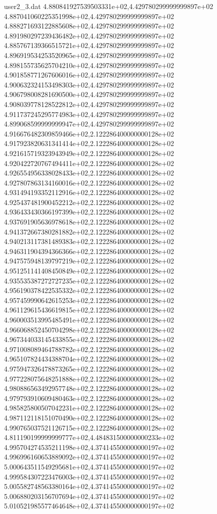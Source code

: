\begin{filecontents}{user2_3.dat}
4.880841927539503331e+02,4.429780299999999897e+02
4.887041060225351998e+02,4.429780299999999897e+02
4.888271693122885608e+02,4.429780299999999897e+02
4.891980297239436482e+02,4.429780299999999897e+02
4.885767139366515721e+02,4.429780299999999897e+02
4.896919534253520965e+02,4.429780299999999897e+02
4.898155735625704210e+02,4.429780299999999897e+02
4.901858771267606016e+02,4.429780299999999897e+02
4.900632324153498303e+02,4.429780299999999897e+02
4.906798008281690500e+02,4.429780299999999897e+02
4.908039778128522812e+02,4.429780299999999897e+02
4.911737245295774983e+02,4.429780299999999897e+02
4.899068599999999947e+02,4.429780299999999897e+02
4.916676482309859466e+02,2.122286400000000128e+02
4.917923820631341414e+02,2.122286400000000128e+02
4.921615719323943949e+02,2.122286400000000128e+02
4.920422720767494411e+02,2.122286400000000128e+02
4.926554956338028433e+02,2.122286400000000128e+02
4.927807863134160016e+02,2.122286400000000128e+02
4.931494193352112916e+02,2.122286400000000128e+02
4.925437481900452212e+02,2.122286400000000128e+02
4.936433430366197399e+02,2.122286400000000128e+02
4.937691905636978618e+02,2.122286400000000128e+02
4.941372667380281882e+02,2.122286400000000128e+02
4.940213117381489383e+02,2.122286400000000128e+02
4.946311904394366366e+02,2.122286400000000128e+02
4.947575948139797219e+02,2.122286400000000128e+02
4.951251141408450849e+02,2.122286400000000128e+02
4.935535387272727235e+02,2.122286400000000128e+02
4.956190378422535332e+02,2.122286400000000128e+02
4.957459990642615253e+02,2.122286400000000128e+02
4.961129615436619815e+02,2.122286400000000128e+02
4.960003513995485491e+02,2.122286400000000128e+02
4.966068852450704298e+02,2.122286400000000128e+02
4.967344033145433855e+02,2.122286400000000128e+02
4.971008089464788782e+02,2.122286400000000128e+02
4.965107824434388704e+02,2.122286400000000128e+02
4.975947326478873265e+02,2.122286400000000128e+02
4.977228075648251888e+02,2.122286400000000128e+02
4.980886563492957748e+02,2.122286400000000128e+02
4.979793910609480463e+02,2.122286400000000128e+02
4.985825800507042231e+02,2.122286400000000128e+02
4.987112118151070490e+02,2.122286400000000128e+02
4.990765037521126715e+02,2.122286400000000128e+02
4.811190199999999777e+02,4.484831500000000233e+02
4.995704274535211198e+02,4.374145500000000197e+02
4.996996160653889092e+02,4.374145500000000197e+02
5.000643511549295681e+02,4.374145500000000197e+02
4.999584307223476003e+02,4.374145500000000197e+02
5.005582748563380164e+02,4.374145500000000197e+02
5.006880203156707694e+02,4.374145500000000197e+02
5.010521985577464648e+02,4.374145500000000197e+02

\end{filecontents}
